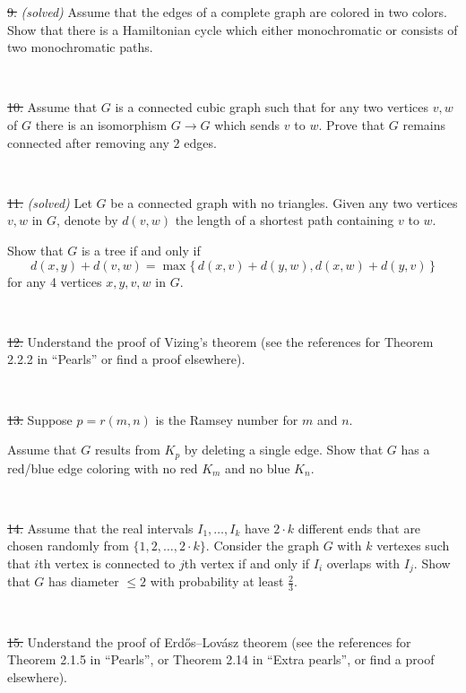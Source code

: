 \documentclass[oneside,a4paper]{article}
\begin{document}
\noindent 
\sout{9.} \textit{(solved)}
Assume that the edges of a complete graph are colored in two colors.
Show that there is a Hamiltonian cycle which either monochromatic or consists of two monochromatic paths.

\ 

\noindent %
\sout{10.}  %
Assume that $G$ is a connected cubic graph such that 
for any two vertices $v,w$ of $G$ there is an isomorphism
$G\to G$ which sends $v$ to $w$.
Prove that $G$ remains connected after removing any $2$ edges.

\ 


\noindent \sout{11.} \textit{(solved)}
Let $G$ be a connected graph with no triangles.
Given any two vertices $v,w$ in $G$, denote by $d(v,w)$ the length of a shortest path containing $v$ to $w$. 

Show that $G$ is a tree if and only if
\[d(x,y)+d(v,w)=\max\{\,d(x,v)+d(y,w),d(x,w)+d(y,v)\,\}\]
for any 4 vertices $x,y,v,w$ in $G$.

\ 

\noindent %
\sout{12.} %
Understand the proof of Vizing's theorem (see the references for Theorem 2.2.2 in ``Pearls'' or find a proof elsewhere).

\ 

\noindent %
\sout{13.} %
Suppose $p=r(m,n)$ is the Ramsey number for $m$ and $n$.%


Assume that $G$ results from $K_p$ by deleting a single edge.
Show that $G$ has a red/blue edge coloring with no red
$K_m$ and no blue $K_n$.


\ 

\noindent %
\sout{14.} %
Assume that the real intervals $I_1,\dots,I_k$ have $2{\cdot}k$ different ends that are chosen randomly from $\{1,2,\dots,2{\cdot} k\}$.
Consider the graph $G$ with $k$ vertexes such that $i$th vertex is connected to $j$th vertex if and only if $I_i$ overlaps with $I_j$.
Show that $G$ has diameter $\le 2$ with probability at least $\tfrac23$.

\ 

\noindent %
\sout{15.} 
Understand the proof of Erd\H{o}s--Lov\'{a}sz theorem (see the references for Theorem 2.1.5 in ``Pearls'', or Theorem 2.14 in ``Extra pearls'', or find a proof elsewhere).


\ 
\end{document}
